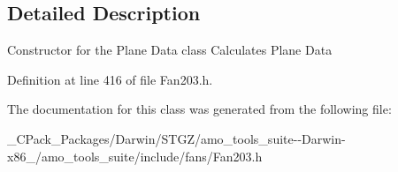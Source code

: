 \subsection{Detailed Description}
Constructor for the Plane Data class Calculates Plane Data 

Definition at line 416 of file Fan203.\+h.



The documentation for this class was generated from the following file\+:\begin{DoxyCompactItemize}
\item 
\+\_\+\+C\+Pack\+\_\+\+Packages/\+Darwin/\+S\+T\+G\+Z/amo\+\_\+tools\+\_\+suite-\/-\/\+Darwin-\/x86\+\_/amo\+\_\+tools\+\_\+suite/include/fans/Fan203.\+h\end{DoxyCompactItemize}
